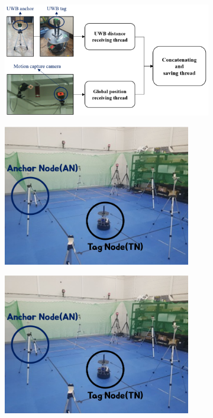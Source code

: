 \documentclass{ieeeaccess}
\begin{document}
\begin{figure}[h]
	\centering
	\begin{subfigure}[b]{.50\textwidth}
		\centering
		\includegraphics[width=.9\textwidth]{image/dataset_process}
		\label{fig:trajectory1} 	
		\caption{}
	\end{subfigure}%
	\begin{subfigure}[b]{.25\textwidth}
		\centering
		\includegraphics[width=0.9\textwidth]{image/anchor_tag_nodes}
		\label{fig:trajectory2} 	
		\caption{}
	\end{subfigure}%
	\begin{subfigure}[b]{.25\textwidth}
		\centering
		\includegraphics[width=0.9\textwidth]{image/anchor_tag_nodes}

\end{subfigure}
\end{figure}
\end{document}
